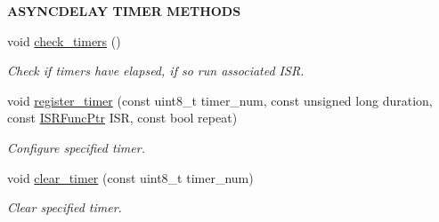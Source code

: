 \begin{Indent}{\bf A\+S\+Y\+N\+C\+D\+E\+L\+AY T\+I\+M\+ER M\+E\+T\+H\+O\+DS}\par
\begin{DoxyCompactItemize}
\item 
void \hyperlink{class_loom___interrupt___manager_af5b0647e08c81406eefd25c3d4cc54f3}{check\+\_\+timers} ()
\begin{DoxyCompactList}\small\item\em Check if timers have elapsed, if so run associated \textquotesingle{}I\+SR\textquotesingle{}. \end{DoxyCompactList}\item 
void \hyperlink{class_loom___interrupt___manager_a1b921c29326cfc93dd4e2e405d50bbdd}{register\+\_\+timer} (const uint8\+\_\+t timer\+\_\+num, const unsigned long duration, const \hyperlink{_interrupt___manager_8h_a21adc8a9b6cc2505b5b1317ca9f74cf3}{I\+S\+R\+Func\+Ptr} I\+SR, const bool repeat)
\begin{DoxyCompactList}\small\item\em Configure specified timer. \end{DoxyCompactList}\item 
void \hyperlink{class_loom___interrupt___manager_a1f52e9304f3b8b1fc93225f6d2e55785}{clear\+\_\+timer} (const uint8\+\_\+t timer\+\_\+num)
\begin{DoxyCompactList}\small\item\em Clear specified timer. \end{DoxyCompactList}\end{DoxyCompactItemize}
\end{Indent}
